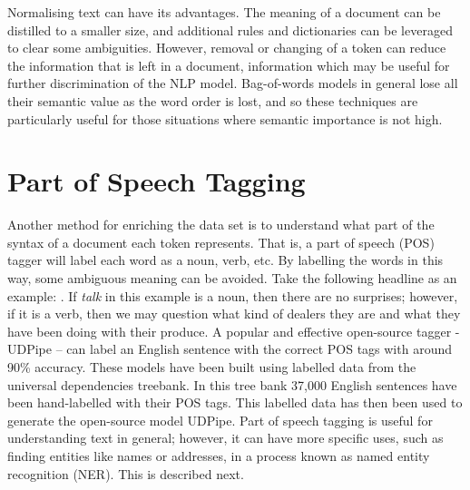 Normalising text can have its advantages. The meaning of a document can be distilled to a smaller size, and additional rules and dictionaries can be leveraged to clear some ambiguities. However, removal or changing of a token can reduce the information that is left in a document, information which may be useful for further discrimination of the NLP model. Bag-of-words models in general lose all their semantic value as the word order is lost, and so these techniques are particularly useful for those situations where semantic importance is not high.

 \section{Part of Speech Tagging}Another method for enriching the data set is to understand what part of the syntax of a document each token represents. That is, a part of speech (POS) tagger will label each word as a noun, verb, etc. By labelling the words in this way, some ambiguous meaning can be avoided. Take the following headline as an example: . If \emph{talk} in this example is a noun, then there are no surprises; however, if it is a verb, then we may question what kind of dealers they are and what they have been doing with their produce. A popular and effective  \parencite{zeman-etal-2018-conll} open-source tagger - UDPipe \parencite{straka-2018-udpipe} – can label an English sentence with the correct POS tags with around 90\% accuracy. These models have been built using labelled data from the universal dependencies treebank. In this tree bank 37,000 English sentences have been hand-labelled with their POS tags. This labelled data has then been used to generate the open-source model UDPipe. Part of speech tagging is useful for understanding text in general; however, it can have more specific uses, such as finding entities like names or addresses, in a process known as named entity recognition (NER). This is described next.
  
